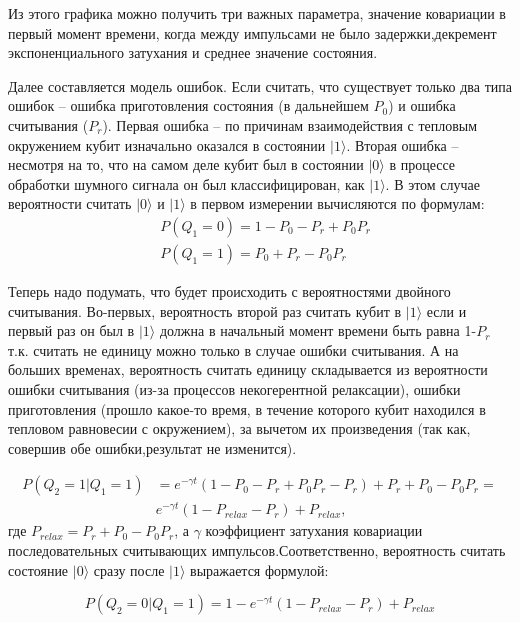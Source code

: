 Из этого графика можно получить три важных параметра, значение ковариации в первый момент времени, когда между импульсами не было задержки,декремент экспоненциального затухания и среднее значение состояния.

Далее составляется модель ошибок. Если считать, что существует только два типа ошибок – ошибка приготовления состояния (в дальнейшем $P_0$) и ошибка считывания ($P_r$). Первая ошибка – по причинам взаимодействия с тепловым окружением кубит изначально оказался в состоянии $|1\rangle$. Вторая ошибка – несмотря на то, что на самом деле кубит был в состоянии $|0\rangle$ в процессе обработки шумного сигнала он был классифицирован, как $|1\rangle$. В этом случае вероятности считать $|0\rangle$ и $|1\rangle$ в первом измерении вычисляются по формулам:
\begin{equation}
\tag{48}
\begin{split}
&P(Q_1 = 0)= 1- P_0 - P_r +P_0P_r\\
&P(Q_1 = 1)= P_0+P_r - P_0P_r
\end{split}
\end{equation}

Теперь надо подумать, что будет происходить с вероятностями двойного считывания. Во-первых, вероятность второй раз считать кубит в $|1\rangle$  если и первый раз он был в $|1\rangle$ должна в начальный момент времени быть равна 1-$P_r$ т.к. считать не единицу можно только  в случае ошибки считывания. А на больших временах, вероятность считать единицу складывается из вероятности ошибки считывания (из-за процессов некогерентной релаксации), ошибки приготовления (прошло какое-то время, в течение которого кубит находился в тепловом равновесии с окружением), за вычетом их произведения (так как, совершив обе ошибки,результат не изменится).

\begin{equation}
\tag{49}
\begin{split}
P(Q_2 = 1 | Q_1 = 1) &= e^{-\gamma t}(1-P_0 - P_r +P_0P_r-P_r)+ P_r +P_0-P_0P_r = \\
&e^{-\gamma t}(1-P_{relax}-P_r)+P_{relax},
\end{split}
\end{equation}
\noindent где $P_{relax} = P_r +P_0-P_0P_r$, а $\gamma$ коэффициент затухания ковариации последовательных считывающих импульсов.Соответственно, вероятность считать состояние $|0\rangle$ сразу после $|1\rangle$ выражается формулой:

\begin{equation}
\label{ubi}
\tag{50}
P(Q_2 = 0 | Q_1 = 1)= 1- e^{-\gamma t}(1-P_{relax}-P_r)+P_{relax}
\end{equation}

